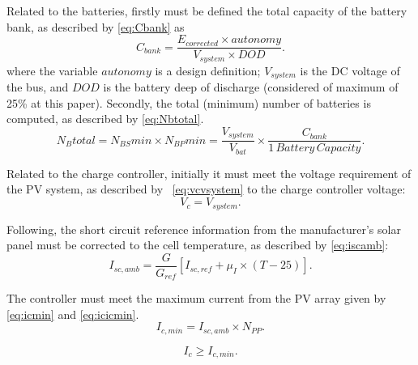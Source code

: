 \documentclass[10pt,conference]{IEEEtran}
\begin{document}
Related to the batteries, firstly must be defined the total capacity of the battery bank, as described by \eqref{eq:Cbank} as
\begin{equation}
\label{eq:Cbank}
\scriptstyle C_{bank} \scriptstyle = \dfrac{\scriptstyle E_{corrected} \scriptstyle \times \scriptstyle autonomy}{\scriptstyle V_{system} \scriptstyle \times \scriptstyle DOD}.
\end{equation}
%
\noindent where the variable $autonomy$ is a design definition; %
$ V_{system} $ is the DC voltage of the bus, and $ DOD $ is the battery deep of discharge (considered of maximum of 25\% at this paper).
%
Secondly, the total (minimum) number of batteries is computed, as described by \eqref{eq:Nbtotal}. 
\begin{equation}
\label{eq:Nbtotal}
\scriptstyle N_{B}total = \scriptstyle N_{BS}min \scriptstyle \times \scriptstyle N_{BP}min = \dfrac{\scriptstyle V_{system}}{\scriptstyle V_{bat}} \scriptstyle \times \dfrac{\scriptstyle C_{bank}}{\scriptstyle 1 \,Battery \, Capacity}.
\end{equation}

Related to the charge controller, initially it must meet the voltage requirement of the PV system, as described by ~\eqref{eq:vcvsystem} to the charge controller voltage: 
\begin{equation}
\label{eq:vcvsystem}
\scriptstyle V_{c} = \scriptstyle V_{system}.
\end{equation}

Following, the short circuit reference information from the manufacturer's solar panel must be corrected to the cell temperature, as described by \eqref{eq:iscamb}:
%
\begin{equation}
\label{eq:iscamb}
\scriptstyle I_{sc,amb} = \dfrac{\scriptstyle G}{\scriptstyle G_{ref}} \left[ \scriptstyle I_{sc,ref} + \scriptstyle \mu_{I} \scriptstyle \times \scriptstyle (T-25) \right]. 
\end{equation}

The controller must meet the maximum current from the PV array given by \eqref{eq:icmin} and \eqref{eq:icicmin}.
\begin{equation}
\label{eq:icmin}
\scriptstyle I_{c,min} = \scriptstyle I_{sc,amb} \times \scriptstyle N_{PP}.
\end{equation}

\begin{equation}
\label{eq:icicmin}
\scriptstyle I_{c} \geq \scriptstyle I_{c,min}.
\end{equation}
\end{document}

